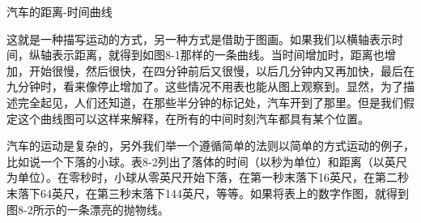 \documentclass[12pt,oneside]{book}
\begin{document}
\begin{common-format}
\vspace{30pt}
\noindent
\begin{minipage}{\textwidth}
\begin{minipage}[c][6cm][c]{0.3\textwidth}
\begin{table}[H]
\centering
\medskip 
{}
\caption*{表 8-1}
\end{table}

\end{minipage}\hfill
\begin{minipage}[c][6cm][c]{0.7\textwidth}
\begin{linefig}[0.9]{汽车的距离-时间曲线}
\caption{汽车的距离-时间曲线}
\label{fig:汽车的距离-时间曲线}
\end{linefig}
\end{minipage} 
\end{minipage} 

\vspace{42pt}

这就是一种描写运动的方式，另一种方式是借助于图画。如果我们以横轴表示时间，纵轴表示距离，就得到如图8-1那样的一条曲线。当时间增加时，距离也增加，开始很慢，然后很快，在四分钟前后又很慢，以后几分钟内又再加快，最后在九分钟时，看来像停止增加了。这些情况不用表也能从图上观察到。显然，为了描述完全起见，人们还知道，在那些半分钟的标记处，汽车开到了那里。但是我们假定这个曲线图可以这样来解释，在所有的中间时刻汽车都具有某个位置。


汽车的运动是复杂的，另外我们举一个遵循简单的法则以简单的方式运动的例子，比如说一个下落的小球。表8-2列出了落体的时间（以秒为单位）和距离（以英尺为单位）。在零秒时，小球从零英尺开始下落，在第一秒末落下16英尺，在第二秒末落下64英尺，在第三秒末落下144英尺，等等。如果将表上的数字作图，就得到图8-2所示的一条漂亮的抛物线。


\end{common-format}
\end{document}
